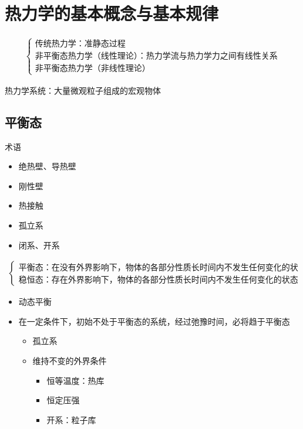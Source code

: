 \chapter{热力学的基本概念与基本规律}

\begin{gather*}
    \begin{cases}
        \text{传统热力学：准静态过程} \\
        \text{非平衡态热力学（线性理论）：热力学流与热力学力之间有线性关系} \\
        \text{非平衡态热力学（非线性理论）}
    \end{cases}
\end{gather*}

热力学系统：大量微观粒子组成的宏观物体

\section{平衡态}

术语
\begin{itemize}
    \item 绝热壁、导热壁
    \item 刚性壁
    \item 热接触
    \item 孤立系
    \item 闭系、开系
\end{itemize}

\begin{gather*}
    \begin{cases}
        \text{平衡态：在没有外界影响下，物体的各部分性质长时间内不发生任何变化的状态}
        \\
        \text{稳恒态：存在外界影响下，物体的各部分性质长时间内不发生任何变化的状态}
    \end{cases}
\end{gather*}

\begin{itemize}
    \item 动态平衡
    \item 在一定条件下，初始不处于平衡态的系统，经过弛豫时间，必将趋于平衡态
    \begin{itemize}
        \item 孤立系
        \item 维持不变的外界条件
        \begin{itemize}
            \item 恒等温度：热库
            \item 恒定压强
            \item 开系：粒子库
        \end{itemize}
    \end{itemize}
\end{itemize}


